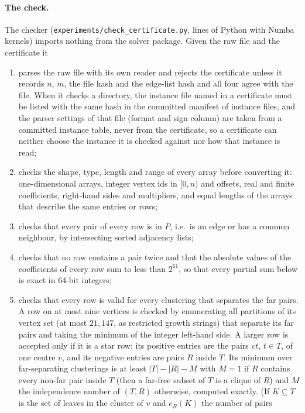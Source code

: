 \paragraph{The check.}  The checker (\texttt{experiments/check\_certificate.py},
\numCheckerLines{} lines of Python with Numba kernels) imports nothing from
the solver package.  Given the raw file and the certificate it
\begin{enumerate}
\item parses the raw file with its own reader and rejects the certificate
unless it records $n$, $m$, the file hash and the edge-list hash and all four
agree with the file.  When it checks a directory, the instance file named in a
certificate must be listed with the same hash in the committed manifest of
instance files, and the parser settings of that file (format and sign column)
are taken from a committed instance table, never from the certificate, so a
certificate can neither choose the instance it is checked against nor how
that instance is read;
\item checks the shape, type, length and range of every array before
converting it: one-dimensional arrays, integer vertex ids in $[0,n)$ and
offsets, real and finite coefficients, right-hand sides and multipliers, and
equal lengths of the arrays that describe the same entries or rows;
\item checks that every pair of every row is in $P$, i.e.\ is an edge or has a
common neighbour, by intersecting sorted adjacency lists;
\item checks that no row contains a pair twice and that the absolute values
of the coefficients of every row sum to less than $2^{61}$, so that every
partial sum below is exact in 64-bit integers;
\item checks that every row is valid for every clustering that separates the
far pairs.  A row on at most nine vertices is checked by enumerating all
partitions of its vertex set (at most $21{,}147$, as restricted growth
strings) that separate its far pairs and taking the minimum of the integer
left-hand side.  A larger row is accepted only if it is a star row: its
positive entries are the pairs $vt$, $t\in T$, of one centre $v$, and its
negative entries are pairs $R$ inside $T$.  Its minimum over far-separating
clusterings is at least $|T|-|R|-M$ with $M=1$ if $R$ contains every non-far
pair inside $T$ (then a far-free subset of $T$ is a clique of $R$) and $M$
the independence number of $(T,R)$ otherwise, computed exactly.  (If $K\subseteq
T$ is the set of leaves in the cluster of $v$ and $e_R(K)$ the number of pairs

\end{enumerate}
